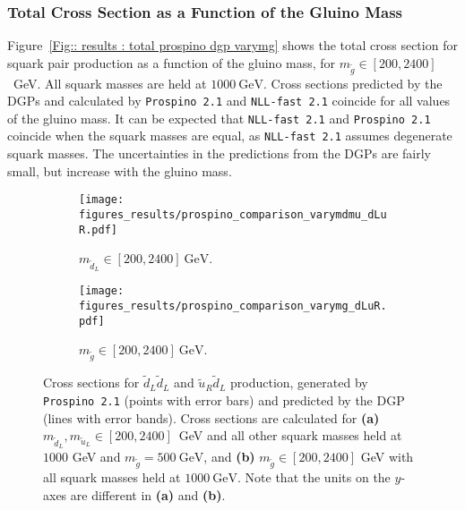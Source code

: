 \documentclass[twoside,english]{uiofysmaster}
\begin{document}
{{\subsubsection{Total Cross Section as a Function of the Gluino Mass}

Figure~\ref{Fig:: results : total prospino dgp varymg} shows the total cross section for squark pair production as a function of the gluino mass, for $m_{\widetilde{g}} \in [200, 2400]$~GeV. All squark masses are held at $1000~\mathrm{GeV}$. Cross sections predicted by the DGPs and calculated by \verb|Prospino 2.1| and \verb|NLL-fast 2.1| coincide for all values of the gluino mass. It can be expected that \verb|NLL-fast 2.1| and \verb|Prospino 2.1| coincide when the squark masses are equal, as \verb|NLL-fast 2.1| assumes degenerate squark masses. The uncertainties in the predictions from the DGPs are fairly small, but increase with the gluino mass. 




\begin{figure}
    \centering
    \begin{subfigure}[b]{0.9\textwidth}
        \texttt{[image: figures\_results/prospino\_comparison\_varymdmu\_dLuR.pdf]}
\caption{$m_{\widetilde{d}_L} \in[200, 2400]~\mathrm{GeV}$.}
\label{Fig:: results : dLuL uLuL prospino dgp}
    \end{subfigure}

    \begin{subfigure}[b]{0.9\textwidth}
    \centering
        \texttt{[image: figures\_results/prospino\_comparison\_varymg\_dLuR.pdf]}
\caption{$m_{\widetilde{g}}\in[200, 2400]~\mathrm{GeV}$.}
\label{Fig:: results : dLuL uLuL prospino dgp varymg}
    \end{subfigure}

\caption[Plots of individual estimated cross sections]{Cross sections for $\widetilde{d}_L \widetilde{d}_L$ and $\widetilde{u}_R \widetilde{d}_L$ production, generated by {\tt Prospino 2.1} (points with error bars) and predicted by the DGP (lines with error bands). Cross sections are calculated for \textbf{(a)} $m_{\widetilde{d}_L}, m_{\widetilde{u}_L} \in [200, 2400]$~GeV and all other squark masses held at $1000$ GeV and $m_{\tilde{g}}=500~\mathrm{GeV}$, and \textbf{(b)} $m_{\tilde{g}} \in [200, 2400]$ GeV with all squark masses held at $ 1000~\mathrm{GeV}$. Note that the units on the $y$-axes are different in \textbf{(a)} and \textbf{(b)}.}\label{Fig:: results : dLuR dLdL cross sections}
\end{figure}


}}
\end{document}
